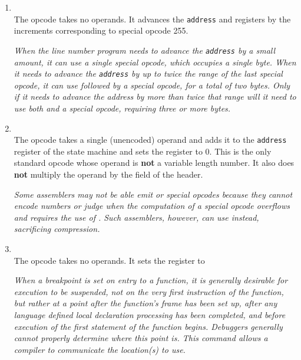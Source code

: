 \begin{enumerate}[1. ]
\item \textbf{\DWLNSconstaddpcTARG} \\
The \DWLNSconstaddpcNAME{} opcode takes
no operands. It advances the \texttt{address} and  registers
by the increments corresponding to special opcode 255.

\textit{When the line number program needs to advance the \texttt{address}
by a small amount, it can use a single special opcode,
which occupies a single byte. When it needs to advance the
\texttt{address} by up to twice the range of the last special opcode,
it can use \DWLNSconstaddpc{} followed by a special opcode,
for a total of two bytes. Only if it needs to advance the
address by more than twice that range will it need to use
both \DWLNSadvancepc{} and a special opcode, requiring three
or more bytes.}

\item \textbf{\DWLNSfixedadvancepcTARG} \\ 
The \DWLNSfixedadvancepcNAME{} opcode
takes a single \HFTuhalf{} (unencoded) operand and adds it to the
\texttt{address} register of the state machine and sets the 
register to 0. This is the only standard opcode whose operand
is \textbf{not} a variable length number. It also does 
\textbf{not} multiply the
operand by the  
field of the header.

\textit{Some assemblers may not be able emit 
\DWLNSadvancepc{} or special opcodes because they cannot encode 
 numbers or judge when
the computation of a special opcode overflows and requires
the use of \DWLNSadvancepc. Such assemblers, however, can
use \DWLNSfixedadvancepc{} instead, sacrificing compression.}

\item \textbf{\DWLNSsetprologueendTARG} \\
The \DWLNSsetprologueendNAME{}
opcode takes no operands. It sets the 
 register
to 

\textit{When a breakpoint is set on entry to a function, it is
generally desirable for execution to be suspended, not on the
very first instruction of the function, but rather at a point
after the function's frame has been set up, after any language
defined local declaration processing has been completed,
and before execution of the first statement of the function
begins. Debuggers generally cannot properly determine where
this point is. This command allows a compiler to communicate
the location(s) to use.}


\end{enumerate}
